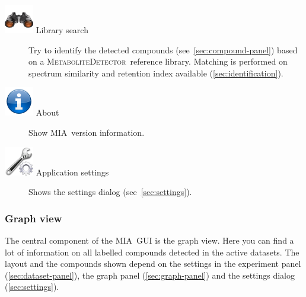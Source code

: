 \documentclass[a4paper,12pt]{scrartcl}
\newcommand*\app{\textsc{MIA}}
\newcommand*\MD{\textsc{MetaboliteDetector}}
\begin{document}
\begin{description}
\item[\includegraphics{gfx/edit-find.png} Library search]
Try to identify the detected compounds (see~\ref{sec:compound-panel}) based on a \MD\ reference library. Matching is performed on spectrum similarity and retention index available (\ref{sec:identification}). %

\item[\includegraphics{gfx/ico_about.png} About]
Show \app\ version information.

\item[\includegraphics{gfx/ico_settings.png} Application settings]
Shows the settings dialog (see~\ref{sec:settings}).

\end{description}

\subsubsection{Graph view}

\label{sec:graph-view}

The central component of the \app\ GUI is the graph view. Here you can find a lot of information on all labelled compounds detected in the active datasets. 
The layout and the compounds shown depend on the settings in the experiment panel (\ref{sec:dataset-panel}), the graph panel (\ref{sec:graph-panel}) and the settings dialog (\ref{sec:settings}).
\end{document}

